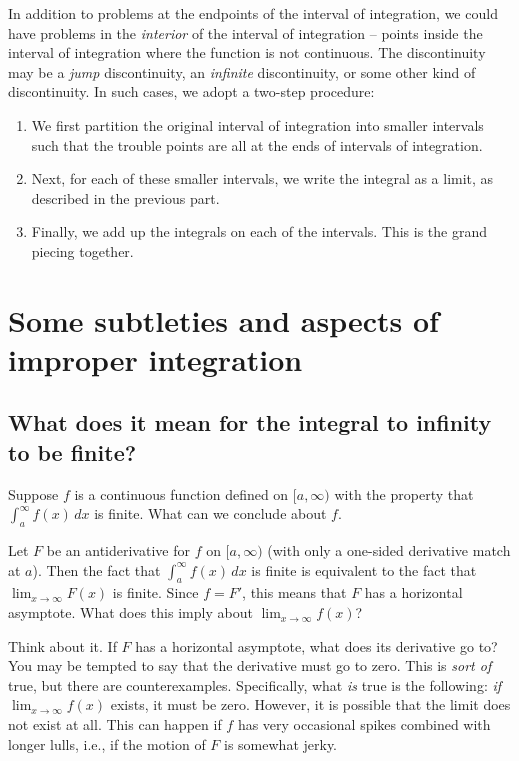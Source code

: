 \documentclass[10pt]{amsart}
\begin{document}
In addition to problems at the endpoints of the interval of
integration, we could have problems in the {\em interior} of the
interval of integration -- points inside the interval of integration
where the function is not continuous. The discontinuity may be a {\em
jump} discontinuity, an {\em infinite} discontinuity, or some other
kind of discontinuity. In such cases, we adopt a two-step procedure:

\begin{enumerate}
\item We first partition the original interval of integration into
  smaller intervals such that the trouble points are all at the ends
  of intervals of integration.
\item Next, for each of these smaller intervals, we write the integral
  as a limit, as described in the previous part.
\item Finally, we add up the integrals on each of the intervals. This
  is the grand piecing together.
\end{enumerate}

\section{Some subtleties and aspects of improper integration}

\subsection{What does it mean for the integral to infinity to be finite?}

Suppose $f$ is a continuous function defined on $[a,\infty)$ with the
property that $\int_a^\infty f(x) \, dx$ is finite. What can we
conclude about $f$.

Let $F$ be an antiderivative for $f$ on $[a,\infty)$ (with only a
one-sided derivative match at $a$). Then the fact that $\int_a^\infty
f(x) \, dx$ is finite is equivalent to the fact that $\lim_{x \to
\infty} F(x)$ is finite. Since $f = F'$, this means that $F$ has a
horizontal asymptote. What does this imply about $\lim_{x \to \infty}
f(x)$?

Think about it. If $F$ has a horizontal asymptote, what does its
derivative go to? You may be tempted to say that the derivative must
go to zero. This is {\em sort of} true, but there are
counterexamples. Specifically, what {\em is} true is the following:
{\em if} $\lim_{x \to \infty} f(x)$ exists, it must be zero. However,
it is possible that the limit does not exist at all. This can happen
if $f$ has very occasional spikes combined with longer lulls, i.e., if
the motion of $F$ is somewhat jerky.
\end{document}
